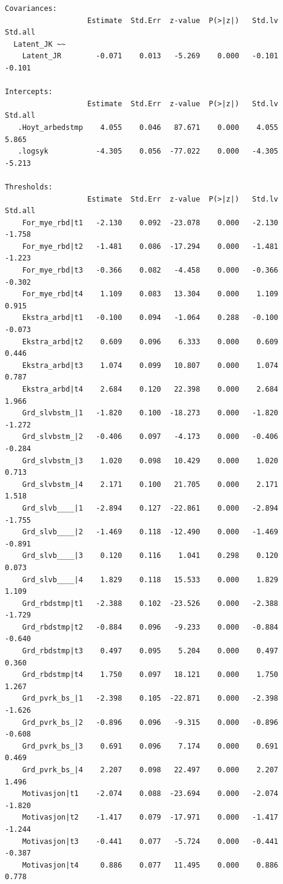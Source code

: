 \documentclass[
  12pt,
  a4paper,
  DIV=11,
  numbers=noendperiod]{scrartcl}
\begin{document}
\begin{verbatim}
Covariances:
                   Estimate  Std.Err  z-value  P(>|z|)   Std.lv  Std.all
  Latent_JK ~~                                                          
    Latent_JR        -0.071    0.013   -5.269    0.000   -0.101   -0.101

Intercepts:
                   Estimate  Std.Err  z-value  P(>|z|)   Std.lv  Std.all
   .Hoyt_arbedstmp    4.055    0.046   87.671    0.000    4.055    5.865
   .logsyk           -4.305    0.056  -77.022    0.000   -4.305   -5.213

Thresholds:
                   Estimate  Std.Err  z-value  P(>|z|)   Std.lv  Std.all
    For_mye_rbd|t1   -2.130    0.092  -23.078    0.000   -2.130   -1.758
    For_mye_rbd|t2   -1.481    0.086  -17.294    0.000   -1.481   -1.223
    For_mye_rbd|t3   -0.366    0.082   -4.458    0.000   -0.366   -0.302
    For_mye_rbd|t4    1.109    0.083   13.304    0.000    1.109    0.915
    Ekstra_arbd|t1   -0.100    0.094   -1.064    0.288   -0.100   -0.073
    Ekstra_arbd|t2    0.609    0.096    6.333    0.000    0.609    0.446
    Ekstra_arbd|t3    1.074    0.099   10.807    0.000    1.074    0.787
    Ekstra_arbd|t4    2.684    0.120   22.398    0.000    2.684    1.966
    Grd_slvbstm_|1   -1.820    0.100  -18.273    0.000   -1.820   -1.272
    Grd_slvbstm_|2   -0.406    0.097   -4.173    0.000   -0.406   -0.284
    Grd_slvbstm_|3    1.020    0.098   10.429    0.000    1.020    0.713
    Grd_slvbstm_|4    2.171    0.100   21.705    0.000    2.171    1.518
    Grd_slvb____|1   -2.894    0.127  -22.861    0.000   -2.894   -1.755
    Grd_slvb____|2   -1.469    0.118  -12.490    0.000   -1.469   -0.891
    Grd_slvb____|3    0.120    0.116    1.041    0.298    0.120    0.073
    Grd_slvb____|4    1.829    0.118   15.533    0.000    1.829    1.109
    Grd_rbdstmp|t1   -2.388    0.102  -23.526    0.000   -2.388   -1.729
    Grd_rbdstmp|t2   -0.884    0.096   -9.233    0.000   -0.884   -0.640
    Grd_rbdstmp|t3    0.497    0.095    5.204    0.000    0.497    0.360
    Grd_rbdstmp|t4    1.750    0.097   18.121    0.000    1.750    1.267
    Grd_pvrk_bs_|1   -2.398    0.105  -22.871    0.000   -2.398   -1.626
    Grd_pvrk_bs_|2   -0.896    0.096   -9.315    0.000   -0.896   -0.608
    Grd_pvrk_bs_|3    0.691    0.096    7.174    0.000    0.691    0.469
    Grd_pvrk_bs_|4    2.207    0.098   22.497    0.000    2.207    1.496
    Motivasjon|t1    -2.074    0.088  -23.694    0.000   -2.074   -1.820
    Motivasjon|t2    -1.417    0.079  -17.971    0.000   -1.417   -1.244
    Motivasjon|t3    -0.441    0.077   -5.724    0.000   -0.441   -0.387
    Motivasjon|t4     0.886    0.077   11.495    0.000    0.886    0.778


\end{verbatim}
\end{document}
